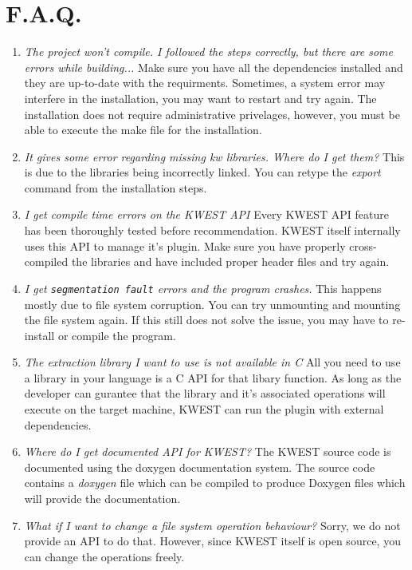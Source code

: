 \section{F.A.Q.}
\begin{enumerate} 
\item \emph{The project won't compile. I followed the steps correctly, but there are some errors while building...} \newline
Make sure you have all the dependencies installed and they are up-to-date with the requirments. Sometimes, a system error may interfere in the installation, you may want to restart and try again. The installation does not require administrative privelages, however, you must be able to execute the make file for the installation.
\item \emph{It gives some error regarding missing kw libraries. Where do I get them?} \newline
This is due to the libraries being incorrectly linked. You can retype the \textit{export} command from the installation steps.
\item \emph{I get compile time errors on the KWEST API} \newline
Every KWEST API feature has been thoroughly tested before recommendation. KWEST itself internally uses this API to manage it's plugin. Make sure you have properly cross-compiled the libraries and have included proper header files and try again.
\item \emph{I get \texttt{segmentation fault} errors and the program crashes.} \newline
This happens mostly due to file system corruption. You can try unmounting and mounting the file system again. If this still does not solve the issue, you may have to re-install or compile the program.
\item \emph{The extraction library I want to use is not available in C} \newline
All you need to use a library in your language is a C API for that libary function. As long as the developer can gurantee that the library and it's associated operations will execute on the target machine, KWEST can run the plugin with external dependencies.
\item \emph{Where do I get documented API for KWEST?} \newline
The KWEST source code is documented using the doxygen documentation system. The source code contains a \textit{doxygen} file which can be compiled to produce Doxygen files which will provide the documentation.
\item \emph{What if I want to change a file system operation behaviour?} \newline
Sorry, we do not provide an API to do that. However, since KWEST itself is open source, you can change the operations freely.
\end{enumerate}